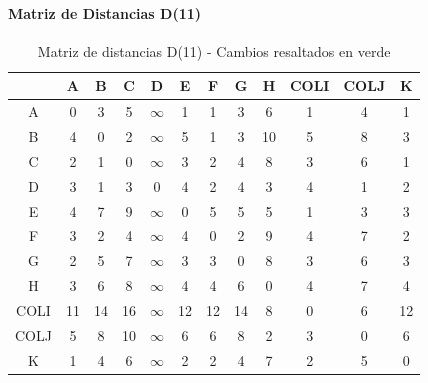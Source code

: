 \documentclass[12pt]{article}
\begin{document}
\paragraph{Matriz de Distancias D(11)}
\begin{table}[h!]
\centering
\begin{tabular}{|c|c|c|c|c|c|c|c|c|c|c|c|}
\hline
 & A & B & C & D & E & F & G & H & COLI & COLJ & K \\\hline
A & 0 & 3 & 5 & $\infty$ & 1 & 1 & 3 & 6 & 1 & 4 & 1 \\\hline
B & \cellcolor{lightgreen} 4 & 0 & 2 & $\infty$ & \cellcolor{lightgreen} 5 & 1 & 3 & \cellcolor{lightgreen} 10 & \cellcolor{lightgreen} 5 & \cellcolor{lightgreen} 8 & 3 \\\hline
C & \cellcolor{lightgreen} 2 & 1 & 0 & $\infty$ & \cellcolor{lightgreen} 3 & 2 & 4 & \cellcolor{lightgreen} 8 & \cellcolor{lightgreen} 3 & \cellcolor{lightgreen} 6 & 1 \\\hline
D & \cellcolor{lightgreen} 3 & 1 & 3 & 0 & \cellcolor{lightgreen} 4 & 2 & 4 & 3 & 4 & 1 & 2 \\\hline
E & \cellcolor{lightgreen} 4 & \cellcolor{lightgreen} 7 & \cellcolor{lightgreen} 9 & $\infty$ & 0 & \cellcolor{lightgreen} 5 & 5 & 5 & 1 & 3 & 3 \\\hline
F & \cellcolor{lightgreen} 3 & 2 & 4 & $\infty$ & \cellcolor{lightgreen} 4 & 0 & 2 & \cellcolor{lightgreen} 9 & \cellcolor{lightgreen} 4 & \cellcolor{lightgreen} 7 & 2 \\\hline
G & 2 & 5 & 7 & $\infty$ & 3 & 3 & 0 & 8 & 3 & 6 & 3 \\\hline
H & 3 & 6 & 8 & $\infty$ & 4 & 4 & 6 & 0 & 4 & 7 & 4 \\\hline
COLI & 11 & 14 & 16 & $\infty$ & 12 & 12 & 14 & 8 & 0 & 6 & 12 \\\hline
COLJ & 5 & 8 & 10 & $\infty$ & 6 & 6 & 8 & 2 & 3 & 0 & 6 \\\hline
K & 1 & 4 & 6 & $\infty$ & 2 & 2 & 4 & 7 & 2 & 5 & 0 \\\hline
\end{tabular}
\caption{Matriz de distancias D(11) - Cambios resaltados en verde}
\end{table}
\end{document}
